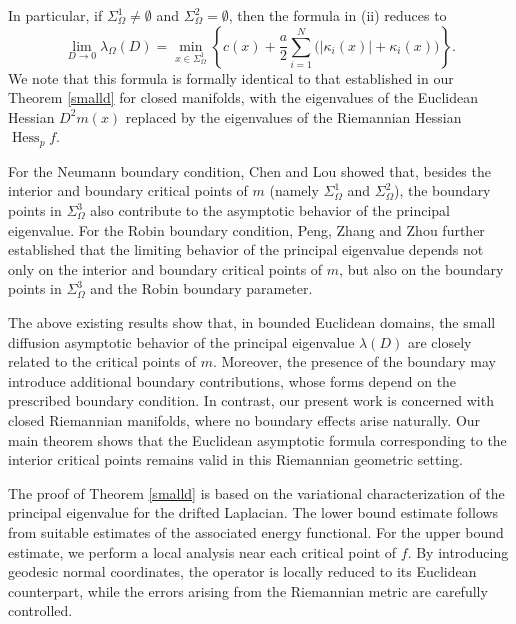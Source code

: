 \documentclass[12pt,reqno]{amsart}
\numberwithin{equation}{section}
\begin{document}
 
In particular, if $\Sigma_{\Omega}^1\neq \emptyset$ and $\Sigma_{\Omega}^2=\emptyset$, then the formula in (ii) reduces to
\[
\lim_{D\to0}\lambda_{\Omega}(D)
=
\min_{x\in\Sigma_{\Omega}^1}
\left\{
c(x)
+\frac{a}{2}
\sum_{i=1}^{N}
\bigl(|\kappa_i(x)|+\kappa_i(x)\bigr)
\right\}.
\]
We note that this formula is formally identical to that established in our Theorem \ref{smalld} for closed manifolds, with the eigenvalues of the Euclidean Hessian $D^2 m(x)$ replaced by the  eigenvalues of the Riemannian Hessian $\operatorname{Hess}_p f$. 
 
For the Neumann boundary condition, Chen and Lou \cite{CL12}  showed that, besides the interior and boundary critical points of $m$ (namely $\Sigma_{\Omega}^1$ and $\Sigma_{\Omega}^2$), the boundary points in $\Sigma_{\Omega}^3$ also contribute to the asymptotic behavior of the principal eigenvalue. For the Robin boundary condition, Peng, Zhang and Zhou \cite{PZZ19} further established that the limiting behavior of the principal eigenvalue depends not only on the interior and boundary critical points of $m$, but also on the boundary points in $\Sigma_{\Omega}^3$ and the Robin boundary parameter.

The above existing results show that, in bounded Euclidean domains, the small diffusion asymptotic behavior of the principal eigenvalue $\lambda(D)$ are closely related to the critical points  of  $m$. Moreover, the presence of the boundary may introduce additional boundary contributions, whose forms depend on the prescribed boundary condition. In contrast, our present work is concerned with closed Riemannian manifolds, where no boundary effects arise naturally. Our main theorem shows that the Euclidean asymptotic formula corresponding to the interior critical points remains valid in this Riemannian geometric setting.

The proof of Theorem \ref{smalld} is based on the variational characterization of the principal eigenvalue for the drifted Laplacian. The lower bound estimate follows from suitable estimates of the associated energy functional. For the upper bound estimate, we perform a local analysis near each critical point of $f$. By introducing geodesic normal coordinates, the operator is locally reduced to its Euclidean counterpart, while the errors arising from the Riemannian metric are carefully controlled.   %
\end{document}
